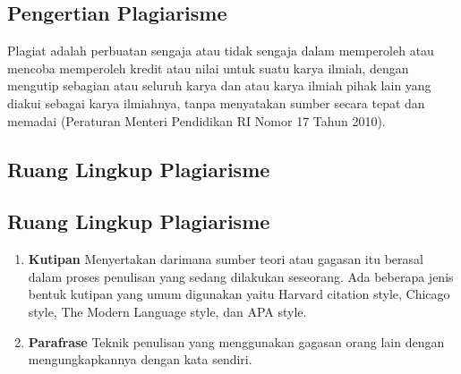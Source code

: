 \subsection{Pengertian Plagiarisme}
Plagiat adalah perbuatan sengaja atau tidak sengaja dalam memperoleh atau mencoba memperoleh kredit atau nilai untuk suatu karya ilmiah, dengan mengutip sebagian atau seluruh karya dan atau karya ilmiah pihak lain yang diakui sebagai karya ilmiahnya, tanpa menyatakan sumber secara tepat dan memadai (Peraturan Menteri Pendidikan RI Nomor 17 Tahun 2010).

\subsection{Ruang Lingkup Plagiarisme}

\subsection{Ruang Lingkup Plagiarisme}
\begin{enumerate}
    \item \textbf{Kutipan} 
     \newline Menyertakan darimana sumber teori atau gagasan itu berasal dalam proses penulisan yang sedang dilakukan seseorang. Ada beberapa jenis bentuk kutipan yang umum digunakan yaitu Harvard citation style, Chicago style, The Modern Language style, dan APA style.
     \item \textbf{Parafrase}
     \newline Teknik penulisan yang menggunakan gagasan orang lain dengan mengungkapkannya dengan
kata sendiri.


\end{enumerate}
